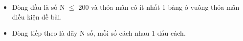 \begin{itemize}
	\item Dòng đầu là số N  $\le$  200 và thỏa mãn có ít nhất 1 bảng ô vuông thỏa mãn điều kiện đề bài.
	\item Dòng tiếp theo là dãy N số, mỗi số cách nhau 1 dấu cách.
\end{itemize}